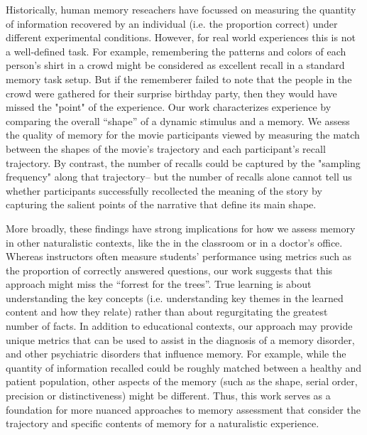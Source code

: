 \documentclass{article}
\begin{document}
{Historically, human memory reseachers have focussed on measuring the quantity of information recovered by an individual (i.e. the proportion correct) under different experimental conditions. However, for real world experiences this is not a well-defined task. For example, remembering the patterns and colors of each person's shirt in a crowd might be considered as excellent recall in a standard memory task setup. But if the rememberer failed to note that the people in the crowd were gathered for their surprise birthday party, then they would have missed the "point" of the experience. Our work characterizes experience by comparing the overall ``shape'' of a dynamic stimulus and a memory. We assess the quality of memory for the movie participants viewed by measuring the match between the shapes of the movie's trajectory and each participant's recall trajectory. By contrast, the number of recalls could be captured by the "sampling frequency" along that trajectory-- but the number of recalls alone cannot tell us whether participants successfully recollected the meaning of the story by capturing the salient points of the narrative that define its main shape.


More broadly, these findings have strong implications for how we assess memory in other naturalistic contexts, like the in the classroom or in a doctor's office.  Whereas instructors often measure students' performance using metrics such as the proportion of correctly answered questions, our work suggests that this approach might miss the ``forrest for the trees''. True learning is about understanding the key concepts (i.e. understanding key themes in the learned content and how they relate) rather than about regurgitating the greatest number of facts. In addition to educational contexts, our approach may provide unique metrics that can be used to assist in the diagnosis of a memory disorder, and other psychiatric disorders that influence memory. For example, while the quantity of information recalled could be roughly matched between a healthy and patient population, other aspects of the memory (such as the shape, serial order, precision or distinctiveness) might be different. Thus, this work serves as a foundation for more nuanced approaches to memory assessment that consider the trajectory and specific contents of memory for a naturalistic experience.

}
\end{document}
